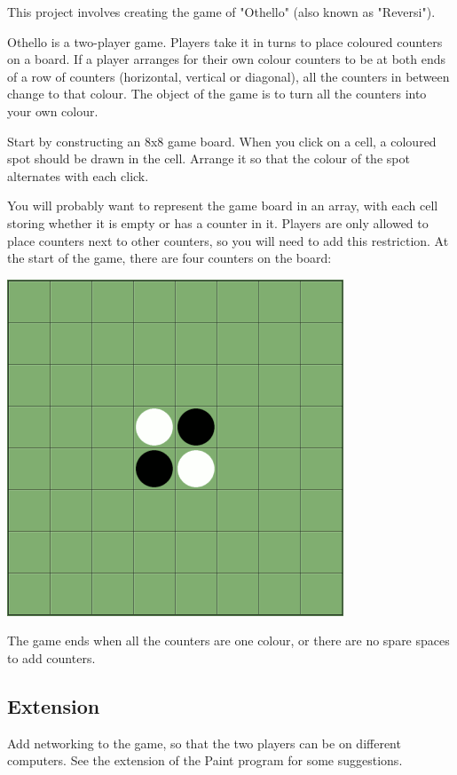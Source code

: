 This project involves creating the game of "Othello" (also known as "Reversi").

Othello is a two-player game. Players take it in turns to place coloured
counters on a board. If a player arranges for their own colour counters
to be at both ends of a row of counters (horizontal, vertical or diagonal),
all the counters in between change to that colour. The object of the game 
is to turn all the counters into your own colour.

Start by constructing an 8x8 game board. When you click on a cell, a
coloured spot should be drawn in the cell. Arrange it so that the colour
of the spot alternates with each click.

You will probably want to represent the game board in an array, with each
cell storing whether it is empty or has a counter in it. Players are only 
allowed to place counters next to other counters, so you will need to add this
restriction. At the start of the game, there are four counters on the board:

\begin{center}
\includegraphics[scale=0.6,angle=0]{screenshots/othello}
\end{center}

The game ends when all the counters are one colour, or there are no spare
spaces to add counters.

\subsection{Extension}

Add networking to the game, so that the two players can be on different
computers. See the extension of the Paint program for some suggestions.

